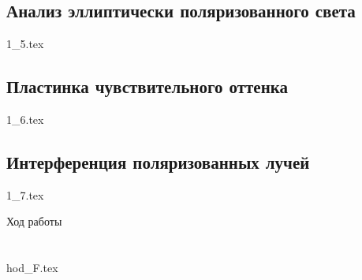 \documentclass[a5paper,10pt, twoside]{article} %
\begin{document}
  \subsection{Анализ эллиптически поляризованного света}
  {1_5.tex}

  \subsection{Пластинка чувствительного оттенка}
  {1_6.tex}

  \subsection{Интерференция поляризованных лучей}
  {1_7.tex}


Ход работы
\section{}
{hod_F.tex}
\end{document}

